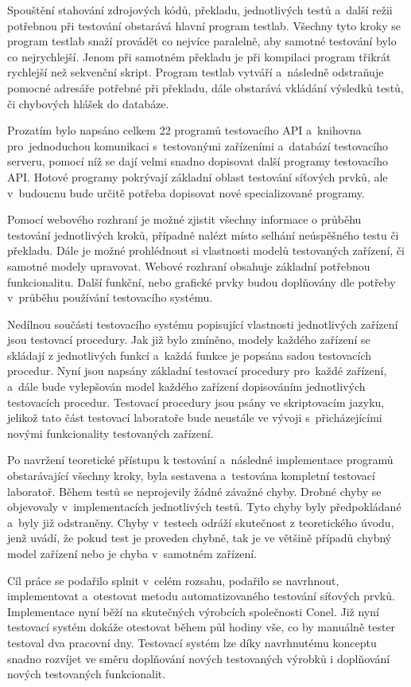 Spouštění stahování zdrojových kódů, překladu, jednotlivých testů a~další režii potřebnou při testování obstarává hlavní program testlab. Všechny tyto kroky se program testlab snaží provádět co nejvíce paralelně, aby samotné testování bylo co nejrychlejší. Jenom při samotném překladu je při kompilaci program třikrát rychlejší než sekvenční skript. Program testlab vytváří a~následně odstraňuje pomocné adresáře potřebné při překladu, dále obstarává vkládání výsledků testů, či chybových hlášek do databáze.

Prozatím bylo napsáno celkem 22 programů testovacího API a~knihovna pro~jednoduchou komunikaci s~testovanými zařízeními a~databází testovacího serveru, pomocí níž se dají velmi snadno dopisovat další programy testovacího API. Hotové programy pokrývají základní oblast testování síťových prvků, ale v~budoucnu bude určitě potřeba dopisovat nové specializované programy.

Pomocí webového rozhraní je možné zjistit všechny informace o průběhu testování jednotlivých kroků, případně nalézt místo selhání neúspěšného testu či překladu. Dále je možné prohlédnout si vlastnosti modelů testovaných zařízení, či samotné modely upravovat. Webové rozhraní obsahuje základní potřebnou funkcionalitu. Další funkční, nebo grafické prvky budou doplňovány dle potřeby v~průběhu používání testovacího systému.

Nedílnou součásti testovacího systému popisující vlastnosti jednotlivých zařízení jsou testovací procedury. Jak již bylo zmíněno, modely každého zařízení se skládají z jednotlivých funkcí a~každá funkce je popsána sadou testovacích procedur. Nyní jsou napsány základní testovací procedury pro~každé zařízení, a~dále bude vylepšován model každého zařízení dopisováním jednotlivých testovacích procedur. Testovací procedury jsou psány ve skriptovacím jazyku, jelikož tato část testovací laboratoře bude neustále ve vývoji s~přicházejícími novými funkcionality testovaných zařízení.

Po navržení teoretické přístupu k testování a~následné implementace programů obstarávající všechny kroky, byla sestavena a~testována kompletní testovací laboratoř. Během testů se neprojevily žádné závažné chyby. Drobné chyby se objevovaly v~implementacích jednotlivých testů. Tyto chyby byly předpokládané a~byly již odstraněny. Chyby v~testech odráží skutečnost z teoretického úvodu, jenž uvádí, že pokud test je proveden chybně, tak je ve většině případů chybný model zařízení nebo je chyba v~samotném zařízení.

Cíl práce se podařilo splnit v~celém rozsahu, podařilo se navrhnout, implementovat a~otestovat metodu automatizovaného testování síťových prvků. Implementace nyní běží na skutečných výrobcích společnosti Conel. Již nyní testovací systém dokáže otestovat během půl hodiny vše, co by manuálně tester testoval dva pracovní dny. Testovací systém lze díky navrhnutému konceptu snadno rozvíjet ve směru doplňování nových testovaných výrobků i doplňování nových testovaných funkcionalit.

\endinput
